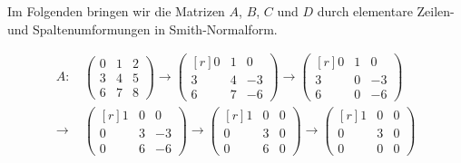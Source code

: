 \documentclass[a4paper,10pt,numbers=noenddot]{scrartcl}
\begin{document}
Im Folgenden bringen wir die Matrizen $A$, $B$, $C$ und $D$ durch elementare Zeilen- und Spaltenumformungen in Smith-Normalform.

\begin{align*}
  A:
  &\,
  \begin{pmatrix}
    0 & 1 & 2 \\
    3 & 4 & 5 \\
    6 & 7 & 8
  \end{pmatrix}
  \to
  \begin{pmatrix*}[r]
    0 & 1 &  0  \\
    3 & 4 & -3  \\
    6 & 7 & -6
  \end{pmatrix*}
  \to
  \begin{pmatrix*}[r]
    0 & 1 &  0  \\
    3 & 0 & -3  \\
    6 & 0 & -6
  \end{pmatrix*}
  \\
  \to&\,
  \begin{pmatrix*}[r]
    1 & 0 &  0  \\
    0 & 3 & -3  \\
    0 & 6 & -6
  \end{pmatrix*}
  \to
  \begin{pmatrix*}[r]
    1 & 0 & 0 \\
    0 & 3 & 0 \\
    0 & 6 & 0
  \end{pmatrix*}
  \to
  \begin{pmatrix*}[r]
    1 & 0 & 0 \\
    0 & 3 & 0 \\
    0 & 0 & 0
  \end{pmatrix*}
\end{align*}
\end{document}
